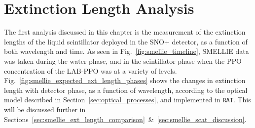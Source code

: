 \section{Extinction Length Analysis}\label{sec:ext_length_analysis}
The first analysis discussed in this chapter is the measurement of the extinction lengths of the liquid scintillator deployed in the SNO+ detector, as a function of both wavelength and time. As seen in Fig.~\ref{fig:smellie_timeline}, SMELLIE data was taken during the water phase, and in the scintillator phase when the PPO concentration of the LAB-PPO was at a variety of levels. Fig.~\ref{fig:smellie_expected_ext_length_phases} shows the changes in extinction length with detector phase, as a function of wavelength, according to the optical model described in Section~\ref{sec:optical_processes}, and implemented in \texttt{RAT}. This will be discussed further in Sections~\ref{sec:smellie_ext_length_comparison}~\&~\ref{sec:smellie_scat_discussion}.

